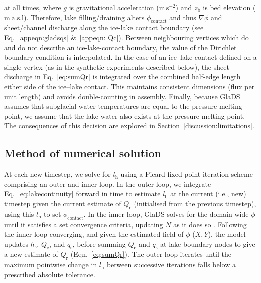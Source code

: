 \documentclass[tc, manuscript]{copernicus}
\providecommand{\DIFadd}[1]{{\protect\color{blue}\uwave{#1}}} %
\providecommand{\DIFdel}[1]{{\protect\color{red}\sout{#1}}} %
\providecommand{\DIFaddbegin}{} %
\providecommand{\DIFaddend}{} %
\providecommand{\DIFdelbegin}{} %
\providecommand{\DIFdelend}{} %
\begin{document}
at all times, where $g$ is gravitational acceleration ($\mathrm{m}\,\mathrm{s}^{-2}$) and $z_{\mathrm{b}}$ is bed elevation ($\mathrm{m \ a.s.l}$). Therefore, lake filling/draining alters $\phi_{\mathrm{contact}}$ and thus $\nabla \phi$ and sheet/channel discharge along the ice-lake contact boundary (see Eq.~\ref{appeqn:gladsqs} \&~\ref{appeqn: Qc}). Between neighbouring vertices which do and do not describe an ice-lake-contact boundary, the value of the Dirichlet boundary condition is interpolated. In the case of an ice--lake contact defined on a single vertex (as in the synthetic experiments described below), the sheet discharge in Eq.~\ref{eq:sumQr} is integrated over the combined half-edge length either side of the ice--lake contact. This maintains consistent dimensions (flux per unit length) and avoids double-counting in assembly. Finally, because GlaDS assumes that subglacial water temperatures are equal to the pressure melting point, we assume that the lake water also exists at the pressure melting point. The consequences of this decision are explored in Section~\ref{discussion:limitations}.

\subsection{Method of numerical solution}\label{methods:Numeric}

At each new timestep, we solve for $l_{\mathrm{h}}$ using a Picard fixed-point iteration scheme comprising an outer and inner loop. In the outer loop, we integrate Eq.~\ref{eq:lakecontinuity} forward in time to estimate $l_{\mathrm{h}}$ at the current (i.e., new) timestep given the current estimate of $Q_{\mathrm{r}}$ (initialised from the previous timestep), using this $l_{\mathrm{h}}$ to set $\phi_{\mathrm{contact}}$. In the inner loop, GlaDS solves for the domain-wide $\phi$ until it satisfies a set convergence criteria, updating $N$ as it does so \citep{werder2013modeling,hill2024improved}. Following the inner loop converging, and given the estimated field of $\phi$ ($X,Y$), the model updates $h_{\mathrm{s}}$, $Q_{\mathrm{c}}$, and \DIFdelbegin \DIFdel{$q_{\mathrm{s}}$}\DIFdelend \DIFaddbegin \DIFadd{$\mathbf{q}_{\mathrm{s}}$}\DIFaddend , before summing $Q_{\mathrm{c}}$ and \DIFdelbegin \DIFdel{$q_{\mathrm{s}}$ }\DIFdelend \DIFaddbegin \DIFadd{$\mathbf{q}_{\mathrm{s}}$ }\DIFaddend at lake boundary nodes to give a new estimate of $Q_{\mathrm{r}}$ (Eqn.~\ref{eq:sumQr}). The outer loop iterates until the maximum pointwise change in $l_{\mathrm{h}}$ between successive iterations falls below a prescribed absolute tolerance.
\end{document}
